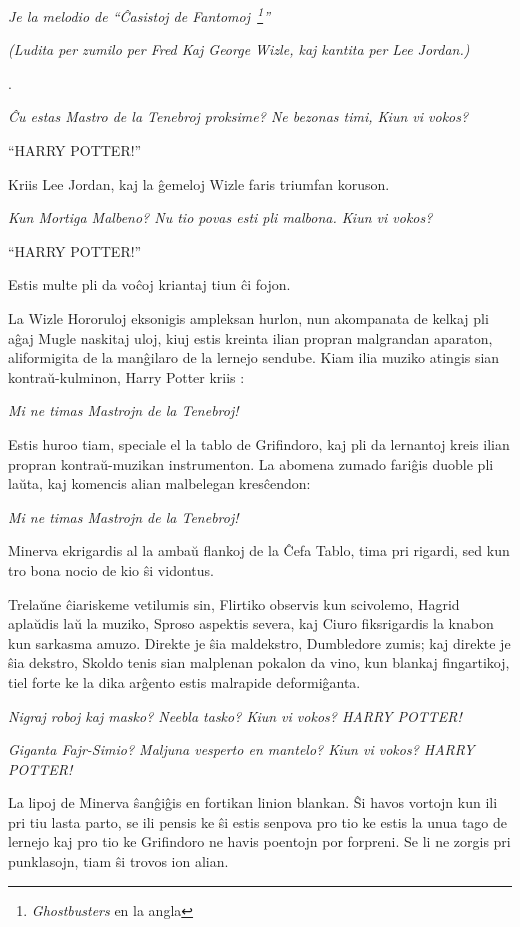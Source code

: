 \emph{Je la melodio de ``Ĉasistoj de Fantomoj~\footnote{\emph{Ghostbusters}
    en la angla}''}

\emph{(Ludita per zumilo per Fred Kaj George Wizle, kaj kantita per
  Lee Jordan.)}

.

\emph{Ĉu estas Mastro de la Tenebroj proksime? Ne bezonas timi, Kiun
  vi vokos?}

``HARRY POTTER!''

Kriis Lee Jordan, kaj la ĝemeloj Wizle faris triumfan koruson.

\emph{Kun Mortiga Malbeno? Nu tio povas esti pli malbona. Kiun vi vokos?}

``HARRY POTTER!''

Estis multe pli da voĉoj kriantaj tiun ĉi fojon.

La Wizle Hororuloj eksonigis ampleksan hurlon, nun akompanata de
kelkaj pli aĝaj Mugle naskitaj uloj, kiuj estis kreinta ilian propran
malgrandan aparaton, aliformigita de la manĝilaro de la lernejo
sendube. Kiam ilia muziko atingis sian kontraŭ-kulminon, Harry Potter
kriis :

\emph{Mi ne timas Mastrojn de la Tenebroj!}

Estis huroo tiam, speciale el la tablo de Grifindoro, kaj pli da
lernantoj kreis ilian propran kontraŭ-muzikan instrumenton. La abomena
zumado fariĝis duoble pli laŭta, kaj komencis alian malbelegan
kresĉendon:

\emph{Mi ne timas Mastrojn de la Tenebroj!}

Minerva ekrigardis al la ambaŭ flankoj de la Ĉefa Tablo, tima pri
rigardi, sed kun tro bona nocio de kio ŝi vidontus.

Trelaŭne ĉiariskeme vetilumis sin, Flirtiko observis kun scivolemo,
Hagrid aplaŭdis laŭ la muziko, Sproso aspektis severa, kaj Ciuro
fiksrigardis la knabon kun sarkasma amuzo. Direkte je ŝia maldekstro,
Dumbledore zumis; kaj direkte je ŝia dekstro, Skoldo tenis sian
malplenan pokalon da vino, kun blankaj fingartikoj, tiel forte ke la
dika arĝento estis malrapide deformiĝanta.

\emph{Nigraj roboj kaj masko? Neebla tasko? Kiun vi vokos?  HARRY
  POTTER!}

\emph{Giganta Fajr-Simio? Maljuna vesperto en mantelo? Kiun vi vokos?
  HARRY POTTER!}

La lipoj de Minerva ŝanĝiĝis en fortikan linion blankan. Ŝi havos
vortojn kun ili pri tiu lasta parto, se ili pensis ke ŝi estis senpova
pro tio ke estis la unua tago de lernejo kaj pro tio ke Grifindoro ne
havis poentojn por forpreni. Se li ne zorgis pri punklasojn, tiam ŝi
trovos ion alian.

